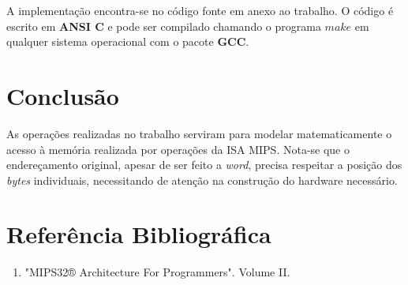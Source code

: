 \documentclass[12pt, a4paper, twoside]{article}
\begin{document}
A implementação encontra-se no código fonte em anexo ao trabalho. O código é
escrito em \textbf{ANSI C} e pode ser compilado chamando o programa $make$ em
qualquer sistema operacional com o pacote \textbf{GCC}.

\section{Conclusão}

As operações realizadas no trabalho serviram para modelar matematicamente o
acesso à memória realizada por operações da ISA MIPS. Nota-se que o
endereçamento original, apesar de ser feito a \textit{word}, precisa respeitar
a posição dos \textit{bytes} individuais, necessitando de atenção na construção
do hardware necessário.

\section{Referência Bibliográfica}

\begin{enumerate}
    \item "MIPS32® Architecture For Programmers". Volume II.
\end{enumerate}
\end{document}
